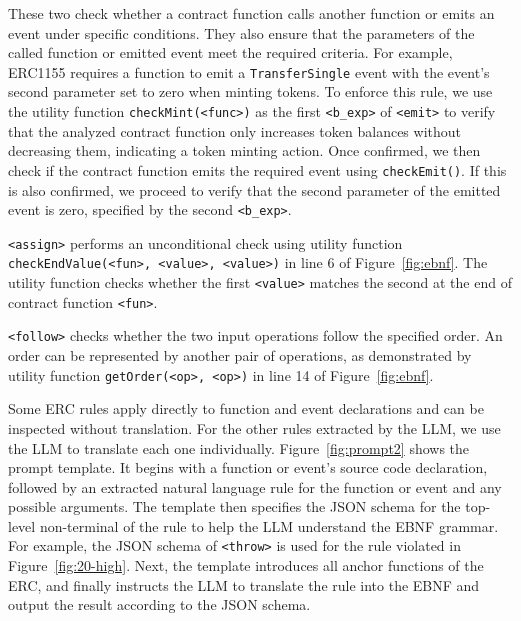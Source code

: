 These two check whether a contract function 
calls another function or emits an event under specific conditions. 
They also ensure that the parameters of the called function 
or emitted event meet the required criteria. 
For example, ERC1155 requires a function to emit
a \texttt{TransferSingle} event with the event's second 
parameter set to zero when minting tokens. 
To enforce this rule, we use the utility function \texttt{checkMint(<func>)} 
as the first \texttt{<b\_exp>} of \texttt{<emit>} to verify that the analyzed 
contract function only increases token balances without decreasing them, 
indicating a token minting action. Once confirmed, we then check if the 
contract function emits the required event using \texttt{checkEmit()}. 
If this is also confirmed, we proceed to verify that the second parameter 
of the emitted event is zero, specified by the second \texttt{<b\_exp>}.




\texttt{<assign>} performs an unconditional check 
using utility function \texttt{checkEndValue(<fun>, <value>, <value>)} 
in line 6 of Figure~\ref{fig:ebnf}.
The utility function checks whether the first \texttt{<value>} matches 
the second at the end of contract function \texttt{<fun>}.


\texttt{<follow>} checks whether the two input operations follow the specified order. An order can be represented by another pair of operations, as demonstrated by 
utility function \texttt{getOrder(<op>, <op>)} in line 14 of Figure~\ref{fig:ebnf}.


Some ERC rules apply directly to function and event declarations 
and can be inspected without translation. For the other rules extracted by the LLM, 
we use the LLM to translate each one individually. 
Figure~\ref{fig:prompt2} shows the prompt template. 
It begins with a function or event's source code declaration, 
followed by an extracted natural language rule for the function or event 
and any possible arguments. 
The template then specifies the JSON schema for the top-level non-terminal of 
the rule to help the LLM understand the EBNF grammar. 
For example, the JSON schema of \texttt{<throw>}
is used for the rule violated in Figure~\ref{fig:20-high}. 
Next, the template introduces all anchor functions of the ERC, and finally instructs the LLM to translate the rule into the EBNF and output the result according to the JSON schema.





